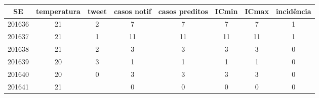 \begin{tabular}{c|ccccccc}
  \hline
SE & temperatura & tweet & casos notif & casos preditos & ICmin & ICmax & incidência \\ 
  \hline
201636 & 21 & 2 & 7 & 7 & 7 & 7 & 1 \\ 
  201637 & 21 & 1 & 11 & 11 & 11 & 11 & 1 \\ 
  201638 & 21 & 2 & 3 & 3 & 3 & 3 & 0 \\ 
  201639 & 20 & 3 & 1 & 1 & 1 & 1 & 0 \\ 
  201640 & 20 & 0 & 3 & 3 & 3 & 3 & 0 \\ 
  201641 & 21 &  & 0 & 0 & 0 & 0 & 0 \\ 
   \hline
\end{tabular}
